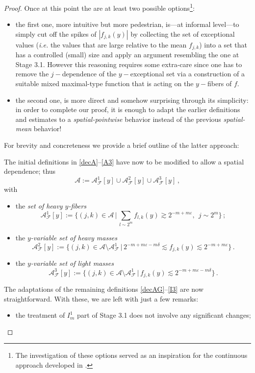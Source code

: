 \documentclass[a4paper,reqno]{amsart}
\numberwithin{equation}{section}
\theoremstyle{definition}
\def\F{\mathcal{F}}
\def\v{\varepsilon}
\def\A{\mathcal{A}}
\def\d{\delta}
\begin{document}
\begin{proof}
Once at this point the are at least two possible options\footnote{The investigation of these options served as an inspiration for the continuous approach developed in \cite{HsL24}.}:
\begin{itemize}
\item the first one, more intuitive but more pedestrian, is---at informal level---to simply cut off the spikes of $|f_{j,k}(y)|$ by collecting the set of exceptional values (\emph{i.e.} the values that are large relative to the mean $f_{j,k}$) into a set that has a controlled (small) size and apply an argument resembling the one at Stage 3.1. However this reasoning requires some extra-care since one has to remove the $j-$dependence of the $y-$exceptional set via a construction of a suitable mixed maximal-type function that is acting on the $y-$fibers of $f$. 

\item the second  one, is more direct and somehow surprising through its simplicity: in order to complete our proof, it is enough to adapt the earlier definitions and estimates to a \emph{spatial-pointwise} behavior instead of the previous \emph{spatial-mean} behavior!
\end{itemize}

For brevity and concreteness we provide a brief outline of the latter approach: 

The initial definitions in \eqref{decA}--\eqref{A3} have now to be modified to allow a spatial dependence; thus
\begin{equation}\label{decAmod}
	\A:=\A_{\F}^{1}[y]\cup \A_{\F}^{2}[y]\cup \A_{\F}^{3}[y] \,,
\end{equation}
with
\begin{itemize}
	\item the \emph{set of heavy $y$-fibers}
	\begin{equation}\label{A1mod}
		\A_{\F}^{1}[y]:=\Big\{(j,k)\in\A\,|\,\sum_{l\sim 2^m} f_{l,k}(y)\gtrsim 2^{-m+m\v},\:\:j\sim 2^m\Big\}\,;
	\end{equation}
	\item  the \emph{$y$-variable set of heavy masses}
	\begin{equation}\label{A2mod}
		\A_{\F}^{2}[y]:=\Big\{(j,k)\in \A\setminus \A_{\F}^{1}\,|\,2^{-m+m\v-m\d}\lesssim f_{j,k}(y)\lesssim 2^{-m+m\v}\Big\}\,.
	\end{equation}
	\item the \emph{$y$-variable set of light masses}
	\begin{equation}\label{A3mod}
		\A_{\F}^{3}[y]:=\Big\{(j,k)\in \A\setminus \A_{\F}^{1}\,|\,f_{j,k}(y)\lesssim 2^{-m+m\v-m\d}\Big\}\,.
	\end{equation}
\end{itemize}
The adaptations of the remaining definitions \eqref{decAG}--\eqref{I3} are now straightforward. With these, we are left with just a few remarks:
\begin{itemize}
\item the treatment of $I_m^1$ part of Stage 3.1 does not involve any significant changes;


\end{itemize}
\end{proof}
\end{document}
